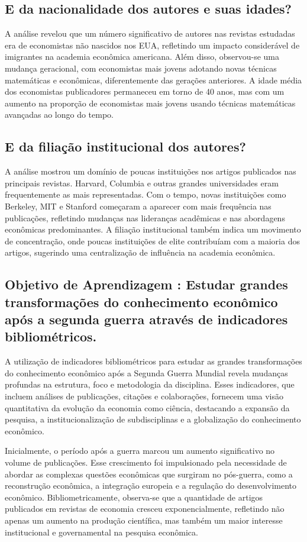 \documentclass[a4paper,12pt]{article}[abntex2]
\begin{document}
\subsection{\textbf{E da nacionalidade dos autores e suas idades?}}
A análise revelou que um número significativo de autores nas revistas estudadas era de economistas não nascidos nos EUA, refletindo um impacto considerável de imigrantes na academia econômica americana. Além disso, observou-se uma mudança geracional, com economistas mais jovens adotando novas técnicas matemáticas e econômicas, diferentemente das gerações anteriores. A idade média dos economistas publicadores permaneceu em torno de 40 anos, mas com um aumento na proporção de economistas mais jovens usando técnicas matemáticas avançadas ao longo do tempo.

\subsection{\textbf{E da filiação institucional dos autores?}}
 A análise mostrou um domínio de poucas instituições nos artigos publicados nas principais revistas. Harvard, Columbia e outras grandes universidades eram frequentemente as mais representadas. Com o tempo, novas instituições como Berkeley, MIT e Stanford começaram a aparecer com mais frequência nas publicações, refletindo mudanças nas lideranças acadêmicas e nas abordagens econômicas predominantes. A filiação institucional também indica um movimento de concentração, onde poucas instituições de elite contribuíam com a maioria dos artigos, sugerindo uma centralização de influência na academia econômica.

\subsection{\textbf{Objetivo de Aprendizagem : Estudar grandes transformações do conhecimento econômico após a segunda guerra através de indicadores bibliométricos.}}
A utilização de indicadores bibliométricos para estudar as grandes transformações do conhecimento econômico após a Segunda Guerra Mundial revela mudanças profundas na estrutura, foco e metodologia da disciplina. Esses indicadores, que incluem análises de publicações, citações e colaborações, fornecem uma visão quantitativa da evolução da economia como ciência, destacando a expansão da pesquisa, a institucionalização de subdisciplinas e a globalização do conhecimento econômico.

Inicialmente, o período após a guerra marcou um aumento significativo no volume de publicações. Esse crescimento foi impulsionado pela necessidade de abordar as complexas questões econômicas que surgiram no pós-guerra, como a reconstrução econômica, a integração europeia e a regulação do desenvolvimento econômico. Bibliometricamente, observa-se que a quantidade de artigos publicados em revistas de economia cresceu exponencialmente, refletindo não apenas um aumento na produção científica, mas também um maior interesse institucional e governamental na pesquisa econômica.
\end{document}
